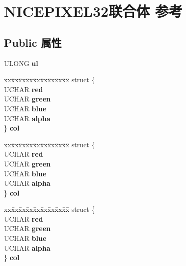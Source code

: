 \hypertarget{union_n_i_c_e_p_i_x_e_l32}{}\section{N\+I\+C\+E\+P\+I\+X\+E\+L32联合体 参考}
\label{union_n_i_c_e_p_i_x_e_l32}
\subsection*{Public 属性}
\begin{DoxyCompactItemize}
\item 
\mbox{\label{union_n_i_c_e_p_i_x_e_l32_ad50d231c4c884d3d61869fcb013f5ac0}} 
U\+L\+O\+NG {\bfseries ul}
\item 
\mbox{\label{union_n_i_c_e_p_i_x_e_l32_a31667ce21250ddf62e4dfd5480833cd9}} 
\begin{tabbing}
xx\=xx\=xx\=xx\=xx\=xx\=xx\=xx\=xx\=\kill
struct \{\\
\>UCHAR {\bfseries red}\\
\>UCHAR {\bfseries green}\\
\>UCHAR {\bfseries blue}\\
\>UCHAR {\bfseries alpha}\\
\} {\bfseries col}\\

\end{tabbing}\item 
\mbox{\label{union_n_i_c_e_p_i_x_e_l32_a52ccc692d181874cda7e1c304136ae57}} 
\begin{tabbing}
xx\=xx\=xx\=xx\=xx\=xx\=xx\=xx\=xx\=\kill
struct \{\\
\>UCHAR {\bfseries red}\\
\>UCHAR {\bfseries green}\\
\>UCHAR {\bfseries blue}\\
\>UCHAR {\bfseries alpha}\\
\} {\bfseries col}\\

\end{tabbing}\item 
\mbox{\label{union_n_i_c_e_p_i_x_e_l32_a5b32520253a7923ad530a5143838ae9a}} 
\begin{tabbing}
xx\=xx\=xx\=xx\=xx\=xx\=xx\=xx\=xx\=\kill
struct \{\\
\>UCHAR {\bfseries red}\\
\>UCHAR {\bfseries green}\\
\>UCHAR {\bfseries blue}\\
\>UCHAR {\bfseries alpha}\\
\} {\bfseries col}\\


\end{tabbing}
\end{DoxyCompactItemize}
